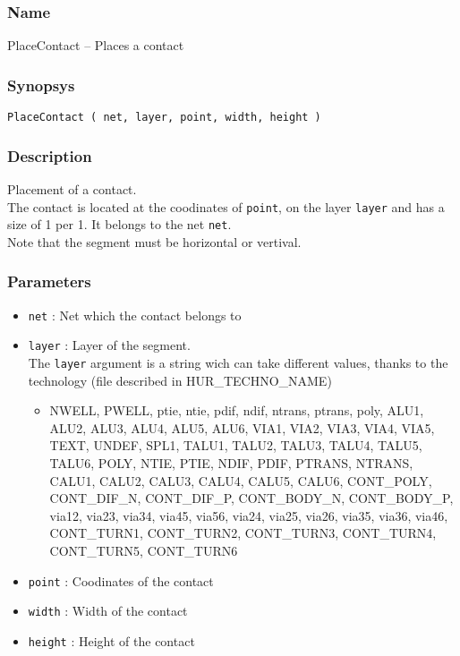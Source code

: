 \subsubsection{Name}

PlaceContact -- Places a contact

\subsubsection{Synopsys}

\begin{verbatim}
PlaceContact ( net, layer, point, width, height )
\end{verbatim}

\subsubsection{Description}

Placement of a contact.\\
\indent The contact is located at the coodinates of \verb-point-, on the layer \verb-layer- and has a size of 1 per 1. It belongs to the net \verb-net-.\\
\indent Note that the segment must be horizontal or vertival.
    
\subsubsection{Parameters}

\begin{itemize}
    \item \verb-net- : Net which the contact belongs to
    \item \verb-layer- : Layer of the segment.\\The \verb-layer- argument is a string wich can take different values, thanks to the technology (file described in HUR\_TECHNO\_NAME)
    \begin{itemize}
        \item NWELL, PWELL, ptie, ntie, pdif, ndif, ntrans, ptrans, poly, ALU1, ALU2, ALU3, ALU4, ALU5, ALU6, VIA1, VIA2, VIA3, VIA4, VIA5, TEXT, UNDEF, SPL1, TALU1, TALU2, TALU3, TALU4, TALU5, TALU6, POLY, NTIE, PTIE, NDIF, PDIF, PTRANS, NTRANS, CALU1, CALU2, CALU3, CALU4, CALU5, CALU6, CONT\_POLY, CONT\_DIF\_N, CONT\_DIF\_P, CONT\_BODY\_N, CONT\_BODY\_P, via12, via23, via34, via45, via56, via24, via25, via26, via35, via36, via46, CONT\_TURN1, CONT\_TURN2, CONT\_TURN3, CONT\_TURN4, CONT\_TURN5, CONT\_TURN6
    \end{itemize}
    \item \verb-point- : Coodinates of the contact
    \item \verb-width- : Width of the contact
    \item \verb-height- : Height of the contact
\end{itemize}
    
